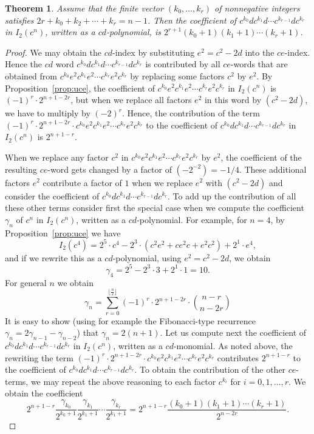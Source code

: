 \documentclass[reqno,12pt]{amsart}
\numberwithin{equation}{section}
\newtheorem{theorem}{Theorem}[section]
\newcommand{\0}{\widehat{0}}
\newcommand{\1}{\widehat{1}}
\newcommand{\2}{\widehat{2}}
\newcommand{\II}{I_2}
\begin{document}
\begin{theorem}
Assume that the finite vector  $(k_0,\ldots,k_{r})$ of nonnegative
integers satisfies $2r+k_0+k_2+\cdots+ k_{r}=n-1$. Then  
the coefficient of $c^{k_0}dc^{k_1} d\cdots c^{k_{r-1}}dc^{k_{r}}$ in
$\II(c^n)$, written as a $cd$-polynomial, is $2^{r+1}(k_0+1)(k_1+1)\cdots
(k_r+1)$. 
\end{theorem}  
\begin{proof}
We may obtain the $cd$-index by substituting $e^2=c^2-2d$ into the
$ce$-index. Hence the $cd$ word $c^{k_0}dc^{k_1} d\cdots
c^{k_{r-1}}dc^{k_{r}}$ is contributed by all $ce$-words that are obtained
from $c^{k_0}e^2c^{k_1} e^2\cdots c^{k_r}e^2c^{k_{r}}$ by replacing
some factors $c^2$ by $e^2$. By Proposition~\ref{prop:uce}, the coefficient
of $c^{k_0}e^2c^{k_1} e^2\cdots c^{k_r}e^2c^{k_{r}}$ in $\II(c^n)$ is
$(-1)^r\cdot 2^{n+1-2r}$, but when we replace all factors $e^2$ in this
word by $(c^2-2d)$, we have to multiply by $(-2)^r$. Hence, the
contribution of the term $(-1)^r\cdot 2^{n+1-2r}\cdot c^{k_0}e^2c^{k_1}
e^2\cdots c^{k_r}e^2c^{k_{r}}$ to the coefficient of $c^{k_0}dc^{k_1} d\cdots
c^{k_{r-1}}dc^{k_{r}}$ in $\II(c^n)$ is $2^{n+1-r}$. 


When we replace any factor $c^2$ in $c^{k_0}e^2c^{k_1} e^2\cdots
c^{k_r}e^2c^{k_{r}}$ by $e^2$,
the coefficient of the resulting $ce$-word gets changed by a factor of
$(-2^{-2})=-1/4$. These additional factors $e^2$ contribute a factor of
$1$ when we replace $e^2$ with $(c^2-2d)$ and consider the coefficient
of $c^{k_0}dc^{k_1} d\cdots c^{k_{r-1}}dc^{k_{r}}$. To add up the
contribution of all these other terms consider first the special case
when we compute the coefficient $\gamma_n$ of $c^n$ in $\II(c^n)$, written as a
$cd$-polynomial. For example, for
$n=4$, by Proposition~\ref{prop:uce} we have
$$
\II(c^4)=2^5\cdot c^4-2^3\cdot (c^2e^2+ce^2c+e^2c^2)+2^1\cdot e^4,
$$
and if we rewrite this as a $cd$-polynomial, using $e^2=c^2-2d$, we
obtain
$$\gamma_4=2^5-2^3\cdot 3+2^1\cdot 1=10.$$
For general $n$ we obtain
$$
\gamma_n=\sum_{r=0}^{\lfloor\frac{n}{2}\rfloor}
(-1)^r\cdot 2^{n+1-2r}\cdot \binom{n-r}{n-2r} 
$$
It is easy to show (using for example the Fibonacci-type recurrence
$\gamma_n=2\gamma_{n-1}-\gamma_{n-2}$) that $\gamma_n=2(n+1)$.
Let us compute next the coefficient of $c^{k_0}dc^{k_1} d\cdots
c^{k_{r-1}}dc^{k_{r}}$ in $\II(c^n)$, written as a $cd$-monomial. As
noted above, the rewriting the term $(-1)^r\cdot 2^{n+1-2r}\cdot
c^{k_0}e^2c^{k_1} e^2\cdots c^{k_r}e^2c^{k_{r}}$ contributes 
$2^{n+1-r}$ to the coefficient of $c^{k_0}dc^{k_1} d\cdots
c^{k_{r-1}}dc^{k_{r}}$. To obtain the contribution of the other
$ce$-terms, we may repeat the above reasoning to each factor $c^{k_i}$
for $i=0,1,\ldots,r$. We obtain the coefficient
$$2^{n+1-r}\frac{\gamma_{k_0}}{2^{k_0+1}}\frac{\gamma_{k_1}}{2^{k_1+1}}\cdots 
    \frac{\gamma_{k_r}}{2^{k_1+1}}=2^{n+1-r}\frac{(k_0+1)(k_1+1)\cdots
    (k_r+1)}{2^{n-2r}} .$$
\end{proof}  
\end{document}
